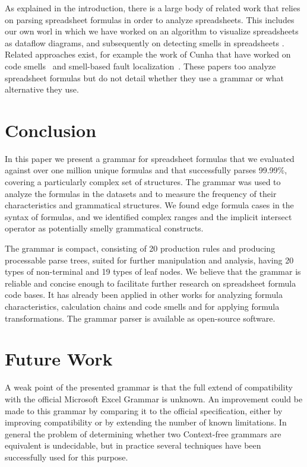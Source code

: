 \documentclass[conference]{IEEEtran}
\begin{document}

As explained in the introduction, there is a large body of related work that relies on parsing spreadsheet formulas in order to analyze spreadsheets. This includes our own worl in which we have worked on an algorithm to visualize spreadsheets as dataflow diagrams\cite{DBLP:conf/icse/HermansPD11}, and subsequently on detecting smells in spreadsheets \cite{DBLP:conf/icse/HermansPD12,DBLP:conf/icsm/Hermans212}. Related approaches exist, for example the work of Cunha that have worked on code smells~\cite{iccsa12} and smell-based fault localization~\cite{conf/icsme/CunhaFMPS14}. These papers too analyze spreadsheet formulas but do not detail whether they use a grammar or what alternative they use.

\section{Conclusion}
\label{section:conclusion}

In this paper we present a grammar for spreadsheet formulas that we evaluated against over one million unique formulas and that successfully parses 99.99\%, covering a particularly complex set of structures. The grammar was used to analyze the formulas in the datasets and to measure the frequency of their characteristics and grammatical structures. We found edge formula cases in the syntax of formulas, and we identified complex ranges and the implicit intersect operator as potentially smelly grammatical constructs.

The grammar is compact, consisting of 20 production rules and producing processable parse trees, suited for further manipulation and analysis, having 20 types of non-terminal and 19 types of leaf nodes. We believe that the grammar is reliable and concise enough to facilitate further research on spreadsheet formula code bases. It has already been applied in other works for analyzing formula characteristics, calculation chains and code smells and for applying formula transformations. The grammar parser is available as open-source software.

\section{Future Work}

A weak point of the presented grammar is that the full extend of compatibility with the official Microsoft Excel Grammar is unknown.
An improvement could be made to this grammar by comparing it to the official specification, either by improving compatibility or by extending the number of known limitations.
In general the problem of determining whether two Context-free grammars are equivalent is undecidable, but in practice several techniques have been successfully used for this purpose.




\end{document}

